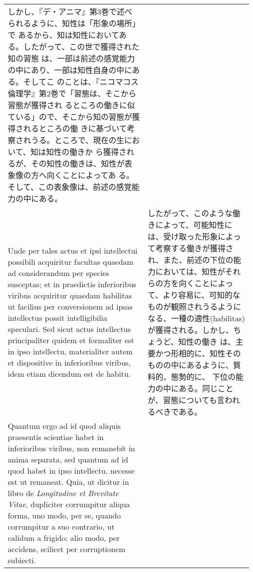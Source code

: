 \documentclass[10pt]{jsarticle} %
\begin{document}
\begin{longtable}{p{21em}p{21em}}
しかし、『デ・アニマ』第3巻で述べられるように、知性は「形象の場所」で
あるから、知は知性においてある。したがって、この世で獲得された知の習態
は、一部は前述の感覚能力の中にあり、一部は知性自身の中にある。そしてこ
のことは、『ニコマコス倫理学』第2巻で「習態は、そこから習態が獲得され
るところの働きに似ている」ので、そこから知の習態が獲得されるところの働
きに基づいて考察されうる。ところで、現在の生において、知は知性の働きか
ら獲得されるが、その知性の働きは、知性が表象像の方へ向くことによってあ
る。そして、この表象像は、前述の感覚能力の中にある。

\\


Unde per tales actus et ipsi intellectui possibili acquiritur facultas
quaedam ad considerandum per species susceptas; et in praedictis
inferioribus viribus acquiritur quaedam habilitas
ut facilius per conversionem ad ipsas intellectus possit
intelligibilia speculari. Sed sicut actus intellectus principaliter
quidem et formaliter est in ipso intellectu, materialiter autem et
dispositive in inferioribus viribus, idem etiam dicendum est de
habitu.

& したがって、このような働きによって、可能知性には、受け取った形象によっ
て考察する働きが獲得され、また、前述の下位の能力においては、知性がそれ
らの方を向くことによって、より容易に、可知的なものが観照されうるように
なる、一種の適性(habilitas)が獲得される。しかし、ちょうど、知性の働き
は、主要かつ形相的に、知性そのものの中にあるように、質料的、態勢的に、
下位の能力の中にある。同じことが、習態についても言われるべきである。



\\


Quantum ergo ad id quod aliquis praesentis scientiae habet in
inferioribus viribus, non remanebit in anima separata, sed quantum ad
id quod habet in ipso intellectu, necesse est ut remaneat. Quia, ut
dicitur in libro de {\it Longitudine et Brevitate Vitae}, dupliciter
corrumpitur aliqua forma, uno modo, per se, quando corrumpitur a suo
contrario, ut calidum a frigido; alio modo, per accidens, scilicet per
corruptionem subiecti.

&


\end{longtable}
\end{document}
